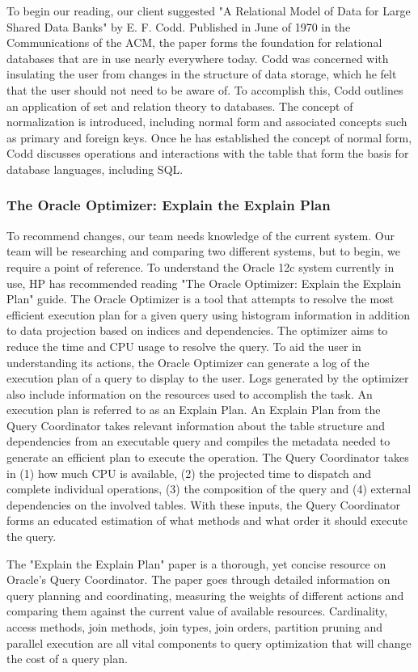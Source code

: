 \documentclass[onecolumn, draftclsnofoot,10pt, compsoc]{IEEEtran}
\begin{document}
To begin our reading, our client suggested "A Relational Model of Data for Large Shared Data Banks" by E. F. Codd.
Published in June of 1970 in the Communications of the ACM, the paper forms the foundation for relational databases that are in use nearly everywhere today.
Codd was concerned with insulating the user from changes in the structure of data storage, which he felt that the user should not need to be aware of.
To accomplish this, Codd outlines an application of set and relation theory to databases. 
The concept of normalization is introduced, including normal form and associated concepts such as primary and foreign keys.
Once he has established the concept of normal form, Codd discusses operations and interactions with the table that form the basis for database languages, including SQL. 

\subsubsection{The Oracle Optimizer: Explain the Explain Plan}
To recommend changes, our team needs knowledge of the current system. 
Our team will be researching and comparing two different systems, but to begin, we require a point of reference.
To understand the Oracle 12c system currently in use, HP has recommended reading  "The Oracle Optimizer: Explain the Explain Plan" guide.
The Oracle Optimizer is a tool that attempts to resolve the most efficient execution plan for a given query using histogram information in addition to data projection based on indices and dependencies.
The optimizer aims to reduce the time and CPU usage to resolve the query.
To aid the user in understanding its actions, the Oracle Optimizer can generate a log of the execution plan of a query  to display to the user.
Logs generated by the optimizer also include information on the resources used to accomplish the task.
An execution plan is referred to as an Explain Plan. 
An Explain Plan from the Query Coordinator takes relevant information about the table structure and dependencies from an executable query and compiles the metadata needed to generate an efficient plan to execute the operation.
The Query Coordinator takes in (1) how much CPU is available, (2) the projected time to dispatch and complete individual operations, (3) the composition of the query and (4) external dependencies on the involved tables.
With these inputs, the Query Coordinator forms an educated estimation of what methods and what order it should execute the query.

The "Explain the Explain Plan" paper is a thorough, yet concise resource on Oracle's Query Coordinator.
The paper goes through detailed information on query planning and coordinating, measuring the weights of different actions and comparing them against the current value of available resources.
Cardinality, access methods, join methods, join types, join orders, partition pruning and parallel execution are all vital components to query optimization that will change the cost of a query plan.  
\end{document}

